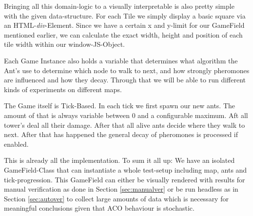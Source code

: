 Bringing all this domain-logic to a visually interpretable is also pretty simple with the given data-structure. For each Tile we simply display a basic square via an HTML-\textit{div}-Element. Since we have a certain x and y-limit for our GameField mentioned earlier, we can calculate the exact width, height and position of each tile width within our window-JS-Object\cite[P. 570]{goodman2002dynamic}.

Each Game Instance also holds a variable that determines what algorithm the Ant's use to determine which node to walk to next, and how strongly pheromones are influenced and how they decay. Through that we will be able to run different kinds of experiments on different maps.

The Game itself is Tick-Based. In each tick we first spawn our new ants. The amount of that is always variable between 0 and a configurable maximum. Aft all tower's deal all their damage. After that all alive ants decide where they walk to next. After that has happened the general decay of pheromones is processed if enabled.

This is already all the implementation. To sum it all up: We have an isolated GameField-Class that can instantiate a whole test-setup including map, ants and tick-progression. This GameField can either be visually rendered with results for manual verification as done in Section \ref{sec:manualver} or be run headless as in Section \ref{sec:autover} to collect large amounts of data which is necessary for meaningful conclusions given that ACO behaviour is stochastic.